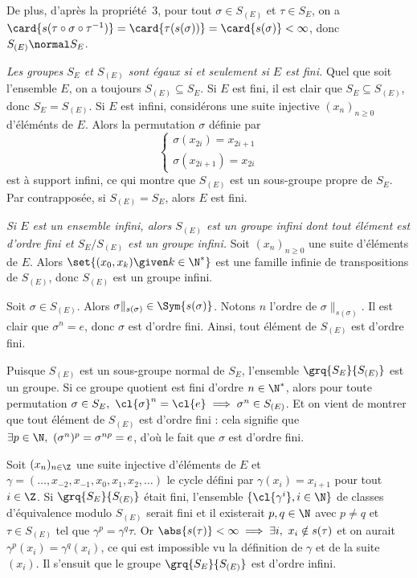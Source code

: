 \begin{enumerate}
    De plus, d'après la propriété~3, pour tout $\sigma\in S_{(E)}$ et $\tau\in S_E$, on a $\card{s(\tau\circ\sigma\circ\tau^{-1})} = \card{\tau(s(\sigma))} = \card{s(\sigma)} < \infty$, donc $S_{(E)}\normal S_E$.

    \emph{Les groupes $S_E$ et $S_{(E)}$ sont égaux si et seulement si $E$ est fini.}
    Quel que soit l'ensemble $E$, on a toujours $S_{(E)} \subseteq S_E$.
    Si $E$ est fini, il est clair que $S_E \subseteq S_{(E)}$, donc $S_E = S_{(E)}$.
    Si $E$ est infini, considérons une suite injective $(x_n)_{n\geq 0}$ d'éléménts de $E$.
    Alors la permutation $\sigma$ définie par
    \[
      \begin{cases}
        \sigma(x_{2i}) = x_{2i + 1} \\
        \sigma(x_{2i + 1}) = x_{2i}
      \end{cases}
    \]
    est à support infini, ce qui montre que $S_{(E)}$ est un sous-groupe propre de $S_E$.
    Par contrapposée, si $S_{(E)} = S_E$, alors $E$ est fini.

    \emph{Si $E$ est un ensemble infini, alors $S_{(E)}$ est un groupe infini dont tout élément est d'ordre fini et $S_E/S_{(E)}$ est un groupe infini.}
    Soit $(x_n)_{n\geq 0}$ une suite d'éléments de $E$.
    Alors $\set{(x_0, x_k) \given k\in\N^*}$ est une famille infinie de transpositions de $S_{(E)}$, donc $S_{(E)}$ est un groupe infini.

    Soit $\sigma\in S_{(E)}$.
    Alors $\sigma\|_{s(\sigma)}\in\Sym{s(\sigma)}$.
    Notons $n$ l'ordre de $\sigma\|_{s(\sigma)}$.
    Il est clair que $\sigma^n = e$, donc $\sigma$ est d'ordre fini.
    Ainsi, tout élément de $S_{(E)}$ est d'ordre fini.

    Puisque $S_{(E)}$ est un sous-groupe normal de $S_E$, l'ensemble $\grq{S_E}{S_{(E)}}$ est un groupe.
    Si ce groupe quotient est fini d'ordre $n\in \N^*$, alors pour toute permutation $\sigma\in S_E,~ \cl{\sigma}^n = \cl{e} \implies \sigma^n\in S_{(E)}$.
    Et on vient de montrer que tout élément de $S_{(E)}$ est d'ordre fini : cela signifie que $\exists p\in \N,~ (\sigma^n)^p = \sigma^{np}=e$, d'où le fait que $\sigma$ est d'ordre fini.

    Soit $(x_n)_{n\in\Z}$ une suite injective d'éléments de $E$ et $\gamma = (\dots, x_{-2}, x_{-1}, x_0, x_1, x_2, \dots)$ le cycle défini par $\gamma(x_i) = x_{i + 1}$ pour tout $i\in\Z$. Si $\grq{S_E}{S_{(E)}}$ était fini, l'ensemble $\{\cl{\gamma^i}, i\in \N \}$ de classes d'équivalence modulo $S_{(E)}$  serait fini et il existerait $p,q \in \N$ avec $p\neq q$ et $\tau \in S_{(E)}$ tel que $\gamma^p = \gamma^q \tau$. Or $\abs{s(\tau)}<\infty \implies \exists i,~ x_i\notin s(\tau)$ et on aurait $\gamma^p(x_i) = \gamma^q(x_i)$, ce qui est impossible vu la définition de $\gamma$ et de la suite $(x_i)$.
    Il s'ensuit que le groupe $\grq{S_E}{S_{(E)}}$ est d'ordre infini.
\end{enumerate}

